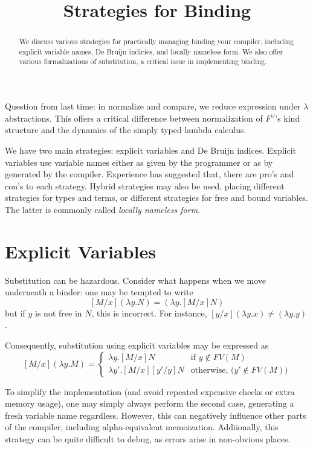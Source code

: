 \documentclass{amsart}
\title{Strategies for Binding}
\newcommand{\defn}[1]{\textit{#1}}
\begin{document}
\begin{abstract}
  We discuss various strategies for practically managing binding your compiler, including explicit variable names, De Bruijn indicies, and locally nameless form. We also offer various formalizations of substitution, a critical issue in implementing binding.
\end{abstract}

\maketitle

Question from last time: in normalize and compare, we reduce expression under $\lambda$ abstractions. This offers a critical difference between normalization of $F^\omega$'s kind structure and the dynamics of the simply typed lambda calculus.

We have two main strategies: explicit variables and De Bruijn indices. Explicit variables use variable names either as given by the programmer or as by generated by the compiler. Experience has suggested that, there are pro's and con's to each strategy. Hybrid strategies may also be used, placing different strategies for types and terms, or different strategies for free and bound variables. The latter is commonly called \defn{locally nameless form}.

\section{Explicit Variables}

Substitution can be hazardous. Consider what happens when we move underneath a binder: one may be tempted to write
\[
[M/x](\lambda y. N) = (\lambda y. [M/x]N)
\]
but if $y$ is not free in $N$, this is incorrect. For instance, $[y/x](\lambda y. x) \not= (\lambda y. y)$.

Consequently, substitution using explicit variables may be expressed as
\[
  [M/x](\lambda y. M) = \begin{cases}
  \lambda y. [M/x]N& \text{if $y \not\in FV(M)$}\\
  \lambda y'. [M/x][y'/y]N& \text{otherwise, ($y' \not\in FV(M)$)}
  \end{cases}
\]

To simplify the implementation (and avoid repeated expensive checks or extra memory usage), one may simply always perform the second case, generating a fresh variable name regardless. However, this can negatively influence other parts of the compiler, including alpha-equivalent memoization. Addiionally, this strategy can be quite difficult to debug, as errors arise in non-obvious places.
\end{document}
